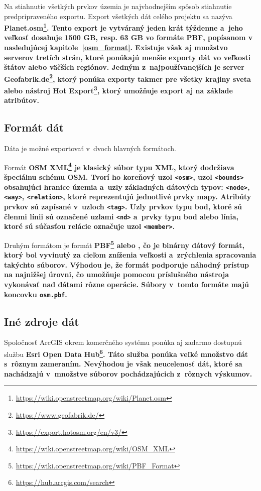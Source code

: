 Na stiahnutie všetkých prvkov územia je najvhodnejším spôsob stiahnutie predpripraveného exportu. Export všetkých dát celého projektu sa nazýva \bf Planet.osm\rm\footnote{\url{https://wiki.openstreetmap.org/wiki/Planet.osm}}. Tento export je vytváraný jeden krát týždenne a~jeho veľkosť dosahuje 1500 GB, resp. 63 GB vo formáte PBF, popísanom v nasledujúcej kapitole~\ref{osm_format}. Existuje však aj množstvo serverov tretích strán, ktoré ponúkajú menšie exporty dát vo veľkosti štátov alebo väčších regiónov. Jedným z~najpoužívanejších je server Geofabrik.de\footnote{\url{https://www.geofabrik.de/}}, ktorý ponúka exporty takmer pre všetky krajiny sveta alebo nástroj Hot Export\footnote{\url{https://export.hotosm.org/en/v3/}}, ktorý umožňuje export aj na základe atribútov.

\subsection*{Formát dát}
\label{osm_format}
Dáta je možné exportovať v~dvoch hlavných formátoch. 

Formát \bf OSM XML\rm\footnote{\url{https://wiki.openstreetmap.org/wiki/OSM_XML}} je klasický súbor typu XML, ktorý dodržiava špeciálnu schému OSM. Tvorí ho koreňový uzol {\tt <osm>}, uzol {\tt <bounds>} obsahujúci hranice územia a~uzly základných dátových typov: {\tt <node>}, {\tt <way>}, {\tt <relation>}, ktoré reprezentujú jednotlivé prvky mapy. Atribúty prvkov sú zapísané v~uzloch {\tt <tag>}. Uzly prvkov typu bod, ktoré sú členmi línii sú označené uzlami {\tt <nd>} a~prvky typu bod alebo línia, ktoré sú súčasťou relácie označuje uzol {\tt <member>}. 

Druhým formátom je formát \bf PBF\rm\footnote{\url{https://wiki.openstreetmap.org/wiki/PBF_Format}} alebo , čo je binárny dátový formát, ktorý bol vyvinutý za cieľom zníženia veľkosti a~zrýchlenia spracovania takýchto súborov. Výhodou je, že formát podporuje náhodný prístup na najnižšej úrovni, čo umožňuje pomocou príslušného nástroja vykonávať nad dátami rôzne operácie. Súbory v~tomto formáte majú koncovku {\tt osm.pbf}.

\subsection*{Iné zdroje dát}
Spoločnosť ArcGIS okrem komerčného systému ponúka aj zadarmo dostupnú službu \bf Esri Open Data Hub\rm\footnote{\url{https://hub.arcgis.com/search}}. Táto služba ponúka veľké množstvo dát s~rôznym zameraním. Nevýhodou je však neucelenosť dát, ktoré sa nachádzajú v~množstve súborov pochádzajúcich z~rôznych výskumov.

